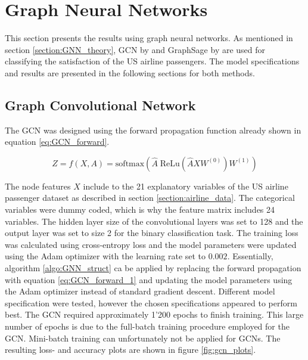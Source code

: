   \section{Graph Neural Networks}

  This section presents the results using graph neural networks. As
  mentioned in section \ref{section:GNN_theory}, GCN by \cite{kipf2016semi} and
  GraphSage by \cite{hamilton2017inductive} are used for classifying the
  satisfaction of the US airline passengers. The model specifications 
  and results are presented in the following sections for both methods.

  \subsection{Graph Convolutional Network}

  The GCN was designed using the forward propagation function already shown in 
  equation \ref{eq:GCN_forward}.

  \begin{equation}
	  Z = f(X,A) = \text{softmax}\left(\hat A \;\text{ReLu}\left(\hat A X
	  W^{(0)}\right)W^{(1)}\right)
      \label{eq:GCN_forward_1}
  \end{equation}

  \noindent The node features $X$ include to the 21 explanatory variables of the 
  US airline passenger dataset as described in section 
  \ref{section:airline_data}. The categorical variables were dummy coded, which
  is why the feature matrix includes 24 variables. The hidden layer size of the 
  convolutional layers was set to 128 and the output layer was set to size 
  2 for the binary classification task. The training loss was calculated using 
  cross-entropy loss and the model parameters were updated using the Adam 
  optimizer \citep{kingma2014adam} with the learning rate set to $0.002$. 
  Essentially, algorithm \ref{algo:GNN_struct} ca be applied by replacing the 
  forward propagation with equation \ref{eq:GCN_forward_1} and updating the 
  model parameters using the Adam optimizer instead of standard gradient descent.
  Different model specification were tested, however the chosen specifications
  appeared to perform best. The GCN required approximately 1'200 epochs to 
  finish training. This large number of epochs is due to the full-batch
  training procedure employed for the GCN. Mini-batch training can
  unfortunately not be applied for GCNs. The resulting loss- and accuracy plots 
  are shown in figure \ref{fig:gcn_plots}.

